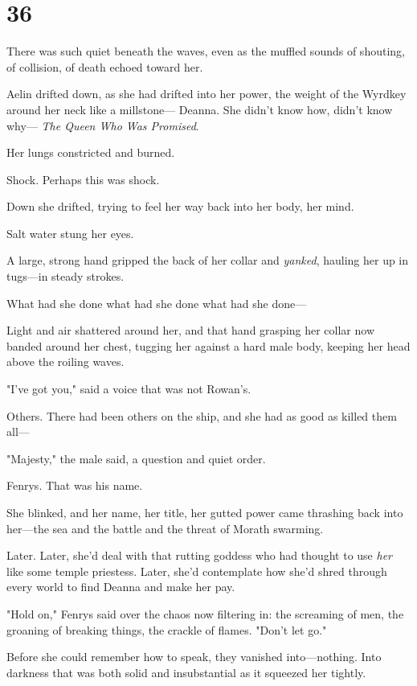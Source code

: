
\chapter{36}

There was such quiet beneath the waves, even as the muffled sounds of shouting, of collision, of death echoed toward her.

Aelin drifted down, as she had drifted into her power, the weight of the Wyrdkey around her neck like a millstone--- Deanna.
She didn't know how, didn't know why--- \emph{The Queen Who Was Promised}.

Her lungs constricted and burned.

Shock.
Perhaps this was shock.

Down she drifted, trying to feel her way back into her body, her mind.

Salt water stung her eyes.

A large, strong hand gripped the back of her collar and \emph{yanked}, hauling her up in tugs---in steady strokes.

What had she done what had she done what had she done---

Light and air shattered around her, and that hand grasping her collar now banded around her chest, tugging her against a hard male body, keeping her head above the roiling waves.

"I've got you," said a voice that was not Rowan's.

Others.
There had been others on the ship, and she had as good as killed them all---

"Majesty," the male said, a question and quiet order.

Fenrys.
That was his name.

She blinked, and her name, her title, her gutted power came thrashing back into her---the sea and the battle and the threat of Morath swarming.

Later.
Later, she'd deal with that rutting goddess who had thought to use \emph{her} like some temple priestess.
Later, she'd contemplate how she'd shred through every world to find Deanna and make her pay.

"Hold on," Fenrys said over the chaos now filtering in: the screaming of men, the groaning of breaking things, the crackle of flames.
"Don't let go."

Before she could remember how to speak, they vanished into---nothing.
Into darkness that was both solid and insubstantial as it squeezed her tightly.

